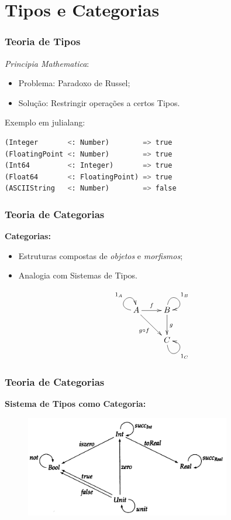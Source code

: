 \documentclass[10pt, compress]{beamer}
\begin{document}
\section{Tipos e Categorias}

\begin{frame}[fragile]
  \frametitle{Teoria de Tipos}
  \begin{block}{\emph{Principia Mathematica}:}
      \begin{itemize}
          \item Problema: Paradoxo de Russel;
          \pause
          \item Solução: Restringir operações a certos Tipos.
      \end{itemize}
  \end{block}
  \pause
  \begin{block}{Exemplo em julialang:}
      \begin{lstlisting}[language=Python, basicstyle=\ttfamily,keywordstyle=\color{red}]
(Integer       <: Number)        => true
(FloatingPoint <: Number)        => true
(Int64         <: Integer)       => true
(Float64       <: FloatingPoint) => true
(ASCIIString   <: Number)        => false
      \end{lstlisting}
  \end{block}
\end{frame}

\begin{frame}[fragile]
  \frametitle{Teoria de Categorias}
  \textbf{Categorias:}
  \begin{itemize}
      \item Estruturas compostas de \emph{objetos} e \emph{morfismos};
      \item Analogia com Sistemas de Tipos.
  \end{itemize}
  \pause
  \huge
  \begin{equation*}
      \xymatrix{
          A \ar@(l,u)^{1_A}[] \ar_{g \circ f}[dr] \ar^f[r] & B \ar@(u,r)^{1_B}[] \ar^g[d]\\
                                                           &C \ar@(d,r)_{1_C}[]
      }
  \end{equation*}
\end{frame}

\begin{frame}[fragile]
  \frametitle{Teoria de Categorias}
  \textbf{Sistema de Tipos como Categoria:}
  \begin{figure}[H]
      \centering
      \includegraphics[width=0.8\textwidth]{categories_types.png}
  \end{figure}
\end{frame}
\end{document}
